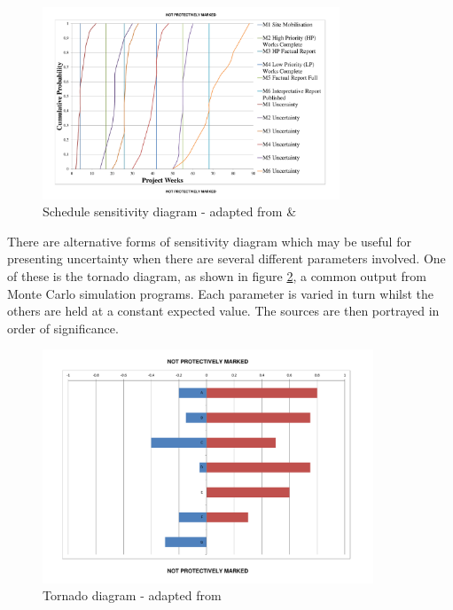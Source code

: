 \begin{figure}[!h]
  \centering
    \includegraphics[width = 0.79\textwidth]{./Figures/ScheduleSensitivity.pdf} 
\caption{Schedule sensitivity diagram - adapted from \cite{hopkinson2008} \& \cite{chapman} }
\label{Figure:SensDiagGantt}
\end{figure}

There are alternative forms of sensitivity diagram which may be useful for presenting uncertainty when there are several different parameters involved. 
One of these is the tornado diagram, as shown in figure \ref{Figure:Tornado}, a common output from Monte Carlo simulation programs.
Each parameter is varied in turn whilst the others are held at a constant expected value.
The sources are then portrayed in order of significance.

\begin{figure}[!h]
  \centering
    \includegraphics[width = 0.88\textwidth]{./Figures/TornadoFig.pdf} 
\caption{Tornado diagram - adapted from \cite{hopkinson2008}}
\label{Figure:Tornado}
\end{figure}

